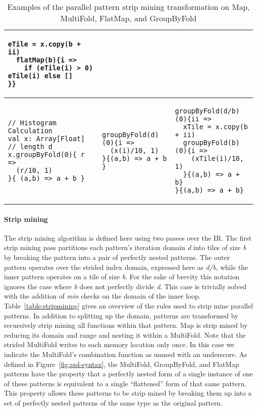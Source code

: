 \documentclass[pageno]{jpaper}
\begin{document}
\begin{table*}[t]
\begin{tabular}{@{}lll@{}}
{\begin{lstlisting}[numbers=none]
  eTile = x.copy(b + ii)
  flatMap(b){i => 
    if (eTile(i) > 0) eTile(i) else [] 
}}
\end{lstlisting}} \\ \midrule 
{\begin{lstlisting}[numbers=none]
// Histogram Calculation
val x: Array[Float] // length d
x.groupByFold(0){ r => 
  (r/10, 1) 
}{ (a,b) => a + b }
\end{lstlisting}}
&
{\begin{lstlisting}[numbers=none]
groupByFold(d)(0){i => 
  (x(i)/10, 1)
}{(a,b) => a + b }
\end{lstlisting}}
&
{\begin{lstlisting}[numbers=none]
groupByFold(d/b)(0){ii => 
  xTile = x.copy(b + ii)
  groupByFold(b)(0){i => 
    (xTile(i)/10, 1)
  }{(a,b) => a + b}
}{(a,b) => a + b}
\end{lstlisting}} \\ \bottomrule
\end{tabular}
\caption{Examples of the parallel pattern strip mining transformation on Map, MultiFold, FlatMap, and GroupByFold}
\label{table:stripmine-examples}
\end{table*} 
\paragraph{Strip mining} 

The strip mining algorithm is defined here using two passes over the IR.
The first strip mining pass partitions each pattern's iteration domain \emph{d} into tiles of size \emph{b} by breaking the pattern into a pair of perfectly nested patterns.
The outer pattern operates over the strided index domain, expressed here as \emph{d/b}, while the inner pattern operates on a tile of size \emph{b}.
For the sake of brevity this notation ignores the case where \emph{b} does not perfectly divide \emph{d}.
This case is trivially solved with the addition of \emph{min} checks on the domain of the inner loop.
Table~\ref{table:stripmining} gives an overview of the rules used to strip mine parallel patterns.
In addition to splitting up the domain, patterns are transformed by recursively strip mining all functions within that pattern.
Map is strip mined by reducing its domain and range and nesting it within a MultiFold. Note that the strided MultiFold writes
to each memory location only once. In this case we indicate the MultiFold's combination function as unused with an underscore.
As defined in Figure~\ref{fig:ppl-syntax}, the MultiFold, GroupByFold, and FlatMap patterns have the property that a perfectly nested form of a single instance of one of these
patterns is equivalent to a single ``flattened'' form of that same pattern. This property allows these patterns to be strip mined by
breaking them up into a set of perfectly nested patterns of the same type as the original pattern.
\end{document}
